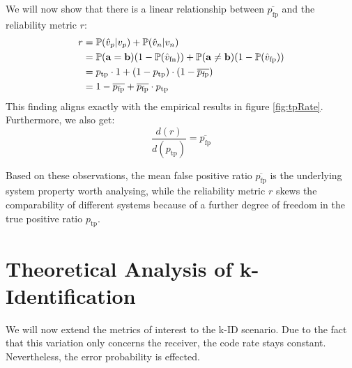 \documentclass[english,BCOR=4mm,cdfont=false]{tudscrreprt} %
\begin{document}
We will now show that there is a linear relationship between $\overline{p_\text{fp}}$ and the reliability metric $r$:
\begin{align}
r &= \mathbb{P}(\hat{v}_p | v_p) + \mathbb{P}(\hat{v}_n|v_n) \\
&= \mathbb{P}(\mathbf{a} = \mathbf{b})(1 - \mathbb{P}(\hat{v}_\text{fn})) +  \mathbb{P}(\mathbf{a} \neq \mathbf{b})(1 - \mathbb{P}(\hat{v}_\text{fp})) \\
&= p_\text{tp} \cdot 1 + (1 - p_\text{tp}) \cdot (1 -\overline{p_\text{fp}}) \\
&= 1 - \overline{p_\text{fp}} + \overline{p_\text{fp}} \cdot p_\text{tp}
\end{align}
This finding aligns exactly with the empirical results in figure \ref{fig:tpRate}. Furthermore, we also get:
\begin{equation}
\frac{d(r)}{d(p_\text{tp})} = \overline{p_\text{fp}}
\end{equation}

Based on these observations, the mean false positive ratio $\overline{p_\text{fp}}$ is the underlying system property worth analysing, while the reliability metric $r$ skews the comparability of different systems because of a further degree of freedom in the true positive ratio $p_\text{tp}$.

\section{Theoretical Analysis of k-Identification}
\label{sec:kIdent}
We will now extend the metrics of interest to the k-ID scenario. Due to the fact that this variation only concerns the receiver, the code rate stays constant. Nevertheless, the error probability is effected.
\end{document}
